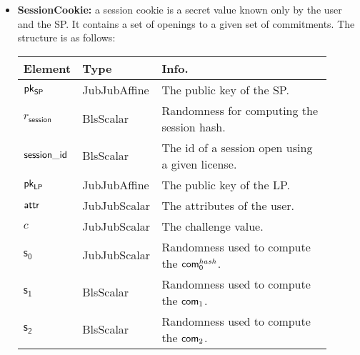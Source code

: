 \begin{itemize}
    \item \textbf{SessionCookie:} a session cookie is a secret value known only by the user and the SP. It contains a set of openings to a given set of commitments. The structure is as follows:

    \begin{center}
        \begin{tabular}{ | p{0.15\linewidth} | p{0.2\linewidth} | p{0.55\linewidth} | } 
        \hline
        \textbf{Element} & \textbf{Type} & \textbf{Info.} \\
        \hline
        $\mathsf{pk}_{\mathsf{SP}}$ & JubJubAffine & The public key of the SP. \\
        $r_\mathsf{session}$ & BlsScalar & Randomness for computing the session hash. \\
        $\mathsf{session\_id}$ & BlsScalar & The id of a session open using a given license. \\ 
        $\mathsf{pk}_{\mathsf{LP}}$ & JubJubAffine & The public key of the LP. \\ 
        $\mathsf{attr}$ & JubJubScalar & The attributes of the user. \\ 
        $c$ & JubJubScalar & The challenge value. \\ 
        $\mathsf{s_0}$ & JubJubScalar & Randomness used to compute the $\mathsf{com}_0^{hash}$. \\
        $\mathsf{s_1}$ & BlsScalar & Randomness used to compute the $\mathsf{com}_1$. \\
        $\mathsf{s_2}$ & BlsScalar & Randomness used to compute the $\mathsf{com}_2$. \\
        \hline
        \end{tabular}
    \end{center}

\end{itemize}
